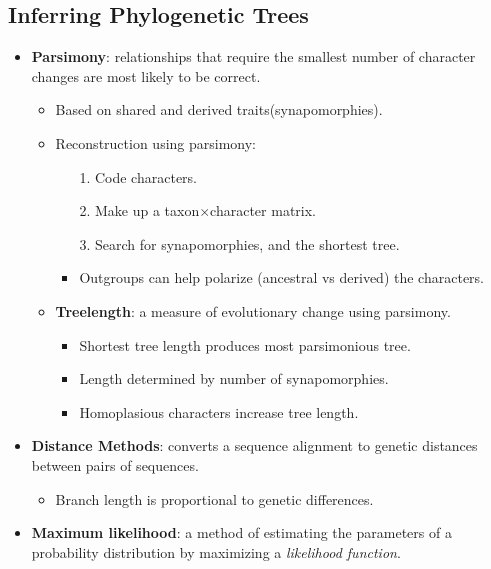 \documentclass[12pt,a4paper]{article}
\begin{document}
\subsection{Inferring Phylogenetic Trees}
\begin{itemize}    
    \item \textbf{Parsimony}: relationships that require the {\color{o-Sun}smallest number of character changes} are most likely to be correct.
        \begin{itemize}
            \item Based on shared and {\color{false}derived} traits(synapomorphies).
            \item Reconstruction using parsimony:
                \begin{itemize}
                    \item[1.] Code characters.
                    \item[2.] Make up a taxon$\times$character matrix.
                    \item[3.] Search for synapomorphies, and the shortest tree.
                    \item Outgroups can help polarize (ancestral vs derived) the characters. 
                \end{itemize}
            \item \textbf{Treelength}: a measure of evolutionary change using parsimony. 
                \begin{itemize}
                    \item Shortest tree length produces most parsimonious tree.
                    \item Length determined by number of synapomorphies.
                    \item Homoplasious characters increase tree length.
                \end{itemize}
        \end{itemize}
    \item \textbf{Distance Methods}: converts a sequence alignment to genetic distances between pairs of sequences.
        \begin{itemize}
            \item Branch length is proportional to genetic differences.
        \end{itemize}
    \item \textbf{Maximum likelihood}: a method of estimating the parameters of a probability distribution by {\color{o-Sun}maximizing a \textit{likelihood function}}. 

\end{itemize}
\end{document}

